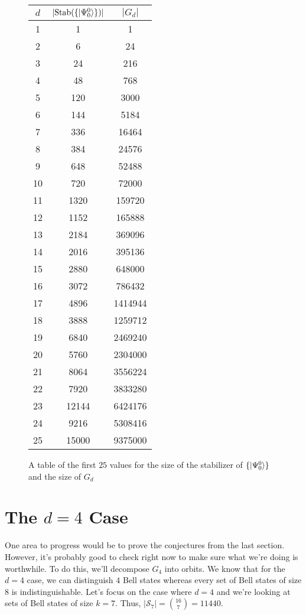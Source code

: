 \begin{figure}
\begin{center}
\begin{tabular}{ | c | c | c| } 
\hline
 $d$ & $|\text{Stab}(\{| \Psi_0^0 \rangle\})|$ & $|G_d|$ \\ 
\hline
1 & 1 & 1 \\ 
\hline
2 & 6 & 24 \\ 
\hline
3 & 24 & 216 \\ 
\hline
4 & 48 & 768 \\ 
\hline
5 & 120 & 3000 \\ 
\hline
6 & 144 & 5184 \\ 
\hline
7 & 336 & 16464 \\ 
\hline
8 & 384 & 24576 \\ 
\hline
9 & 648 & 52488 \\ 
\hline
10 & 720 & 72000 \\ 
\hline
11 & 1320 & 159720 \\ 
\hline
12 & 1152 & 165888 \\ 
\hline
13 & 2184 & 369096 \\ 
\hline
14 & 2016 & 395136 \\ 
\hline
15 & 2880 & 648000 \\ 
\hline
16 & 3072 & 786432 \\ 
\hline
17 & 4896 & 1414944 \\ 
\hline
18 & 3888 & 1259712 \\ 
\hline
19 & 6840 & 2469240 \\ 
\hline
20 & 5760 & 2304000 \\ 
\hline
21 & 8064 & 3556224 \\ 
\hline
22 & 7920 & 3833280 \\ 
\hline
23 & 12144 & 6424176 \\ 
\hline
24 & 9216 & 5308416 \\ 
\hline
25 & 15000 & 9375000 \\ 
\hline
\end{tabular}
\end{center}
\caption{A table of the first $25$ values for the size of the stabilizer of $\{| \Psi_0^0 \rangle\}$ and the size of $G_d$} \label{fig:table1}
\end{figure}

\section{The $d = 4$ Case}

One area to progress would be to prove the conjectures from the last section. However, it's probably good to check right now to make sure what we're doing is worthwhile. To do this, we'll decompose $G_4$ into orbits. We know that for the $d=4$ case, we can distinguish $4$ Bell states whereas every set of Bell states of size $8$ is indistinguishable. Let's focus on the case where $d = 4$ and we're looking at sets of Bell states of size $k = 7$. Thus, $|\mathcal{S}_7| = \binom{16}{7} = 11440$.

